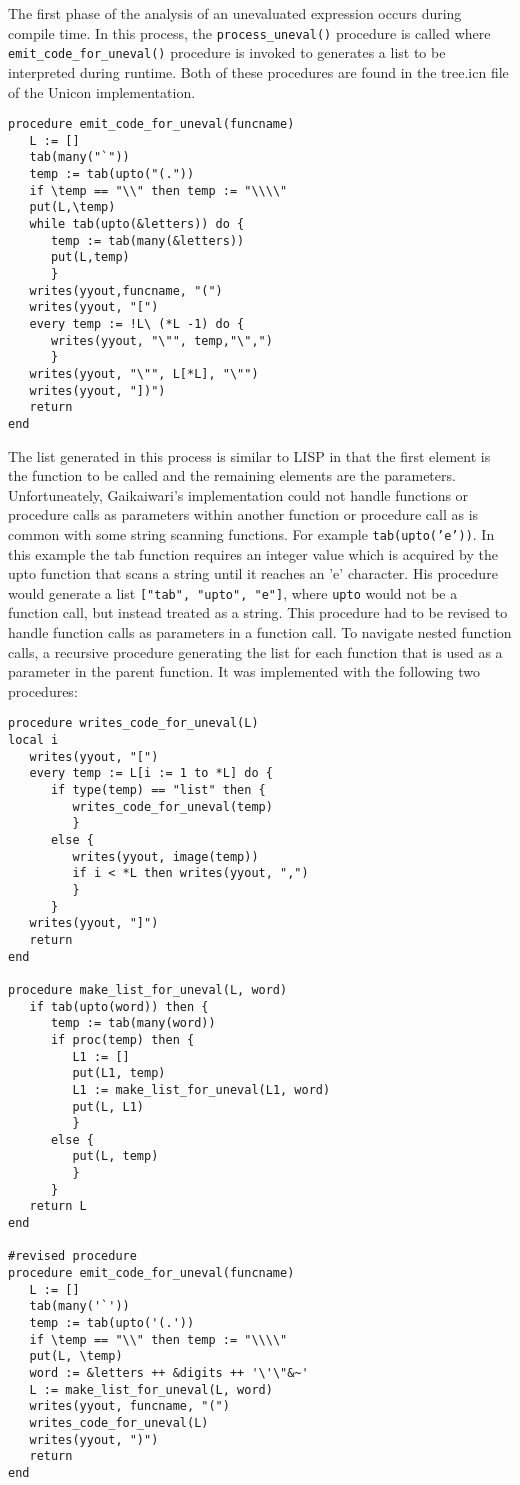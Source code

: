\documentclass{article}
\begin{document}
The first phase of the analysis of an unevaluated expression occurs during compile time.  In this process, the \texttt{process\_uneval()} procedure is called where \texttt{emit\_code\_for\_uneval()} procedure is invoked to generates a list to be interpreted during runtime.  Both of these procedures are found in the tree.icn file of the Unicon implementation.
\begin{verbatim}
procedure emit_code_for_uneval(funcname)
   L := []
   tab(many("`"))
   temp := tab(upto("(.")) 
   if \temp == "\\" then temp := "\\\\"
   put(L,\temp)
   while tab(upto(&letters)) do {
      temp := tab(many(&letters))
      put(L,temp)
      }
   writes(yyout,funcname, "(")
   writes(yyout, "[")
   every temp := !L\ (*L -1) do {
      writes(yyout, "\"", temp,"\",")
      }
   writes(yyout, "\"", L[*L], "\"")
   writes(yyout, "])")
   return
end
\end{verbatim}
The list generated in this process is similar to LISP in that the first element is the function to be called and the remaining elements are the parameters.  Unfortuneately, Gaikaiwari's implementation could not handle functions or procedure calls as parameters within another function or procedure call as is common with some string scanning functions.  For example \texttt{tab(upto('e'))}.  In this example the tab function requires an integer value which is acquired by the upto function that scans a string until it reaches an 'e' character.  His procedure would generate a list \texttt{["tab", "upto", "e"]}, where \texttt{upto} would not be a function call, but instead treated as a string.  This procedure had to be revised to handle function calls as parameters in a function call.  To navigate nested function calls, a recursive procedure generating the list for each function that is used as a parameter in the parent function.  It was implemented with the following two procedures: 
\begin{verbatim}
procedure writes_code_for_uneval(L)
local i
   writes(yyout, "[")
   every temp := L[i := 1 to *L] do {
      if type(temp) == "list" then {
         writes_code_for_uneval(temp)
         } 
      else {
         writes(yyout, image(temp))
         if i < *L then writes(yyout, ",")
         }
      }
   writes(yyout, "]")
   return
end

procedure make_list_for_uneval(L, word)
   if tab(upto(word)) then {
      temp := tab(many(word))
      if proc(temp) then {
         L1 := []
         put(L1, temp)
         L1 := make_list_for_uneval(L1, word)
         put(L, L1)
         }
      else {
         put(L, temp)
         }
      }
   return L
end

#revised procedure
procedure emit_code_for_uneval(funcname)
   L := []
   tab(many('`'))
   temp := tab(upto('(.')) 
   if \temp == "\\" then temp := "\\\\"
   put(L, \temp)
   word := &letters ++ &digits ++ '\'\"&~'
   L := make_list_for_uneval(L, word)
   writes(yyout, funcname, "(")
   writes_code_for_uneval(L)
   writes(yyout, ")")
   return
end
\end{verbatim}
\end{document}
